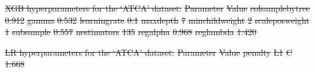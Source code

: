 \documentclass[11pt, a4paper]{book}
\providecommand{\DIFdeltex}[1]{{\protect\color{red}\sout{#1}}}                      %
\providecommand{\DIFdelFL}[1]{\DIFdel{#1}} %
\providecommand{\DIFdel}[1]{\texorpdfstring{\DIFdeltex{#1}}{}} %
\begin{document}
{%
\DIFdelFL{XGB hyperparameters for the `ATCA' dataset.}}
\DIFdelFL{Parameter }%
\DIFdelFL{Value}%
\DIFdelFL{colsample\textunderscore{}bytree }%
\DIFdelFL{0.912}%
\DIFdelFL{gamma }%
\DIFdelFL{0.532}%
\DIFdelFL{learning\textunderscore{}rate }%
\DIFdelFL{0.1}%
\DIFdelFL{max\textunderscore{}depth }%
\DIFdelFL{7}%
\DIFdelFL{min\textunderscore{}child\textunderscore{}weight }%
\DIFdelFL{2}%
\DIFdelFL{scale\textunderscore{}pos\textunderscore{}weight }%
\DIFdelFL{1}%
\DIFdelFL{subsample }%
\DIFdelFL{0.557}%
\DIFdelFL{n\textunderscore{}estimators }%
\DIFdelFL{135}%
\DIFdelFL{reg\textunderscore{}alpha }%
\DIFdelFL{0.968}%
\DIFdelFL{reg\textunderscore{}lambda }%
\DIFdelFL{1.420}%

{%
\DIFdelFL{LR hyperparameters for the `ATCA' dataset.}}
\DIFdelFL{Parameter }%
\DIFdelFL{Value}%
\DIFdelFL{penalty }%
\DIFdelFL{L1}%
\DIFdelFL{C }%
\DIFdelFL{1.668}%
\end{document}

